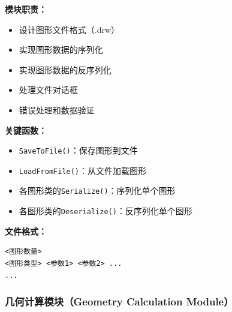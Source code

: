 \documentclass[12pt,a4paper]{article}
\begin{document}
\begin{tcolorbox}
\textbf{模块职责：}
\begin{itemize}
    \item 设计图形文件格式（.drw）
    \item 实现图形数据的序列化
    \item 实现图形数据的反序列化
    \item 处理文件对话框
    \item 错误处理和数据验证
\end{itemize}

\textbf{关键函数：}
\begin{itemize}
    \item \texttt{SaveToFile()}：保存图形到文件
    \item \texttt{LoadFromFile()}：从文件加载图形
    \item 各图形类的\texttt{Serialize()}：序列化单个图形
    \item 各图形类的\texttt{Deserialize()}：反序列化单个图形
\end{itemize}

\textbf{文件格式：}
\begin{verbatim}
<图形数量>
<图形类型> <参数1> <参数2> ...
...
\end{verbatim}
\end{tcolorbox}

\subsubsection{几何计算模块（Geometry Calculation Module）}
\end{document}
